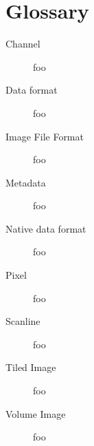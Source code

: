 \chapter{Glossary}

\begin{description}

\item[Channel] foo

\item[Data format] foo

\item[Image File Format] foo

\item[Metadata] foo

\item[Native data format] foo

\item[Pixel] foo

\item[Scanline] foo

\item[Tiled Image] foo

\item[Volume Image] foo

\end{description}

\chapwidthend
